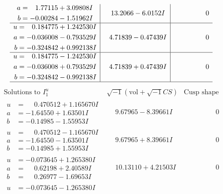 \documentclass[1p]{elsarticle_modified}
\theoremstyle{definition}
\newcommand{\I}{\sqrt{-1}}
\begin{document}
$$\begin{array}{c|c|c}
\begin{aligned}
a &= \phantom{-}1.77115 + 3.09808 I \\
b &= -0.00284 - 1.51962 I\end{aligned}
 & \phantom{-}13.2066 - 6.0152 I & \phantom{-0.000000 } 0 \\ \hline\begin{aligned}
u &= \phantom{-}0.184775 + 1.242530 I \\
a &= -0.036008 - 0.793529 I \\
b &= -0.324842 + 0.992138 I\end{aligned}
 & \phantom{-}4.71839 - 0.47439 I & \phantom{-0.000000 } 0 \\ \hline\begin{aligned}
u &= \phantom{-}0.184775 - 1.242530 I \\
a &= -0.036008 + 0.793529 I \\
b &= -0.324842 - 0.992138 I\end{aligned}
 & \phantom{-}4.71839 + 0.47439 I & \phantom{-0.000000 } 0\\
 \hline 
 \end{array}$$\newpage$$\begin{array}{c|c|c}  
\text{Solutions to }I^u_{1}& \I (\text{vol} + \sqrt{-1}CS) & \text{Cusp shape}\\
 \hline 
\begin{aligned}
u &= \phantom{-}0.470512 + 1.165670 I \\
a &= -1.64550 + 1.63501 I \\
b &= -0.14985 - 1.55953 I\end{aligned}
 & \phantom{-}9.67965 - 8.39661 I & \phantom{-0.000000 } 0 \\ \hline\begin{aligned}
u &= \phantom{-}0.470512 - 1.165670 I \\
a &= -1.64550 - 1.63501 I \\
b &= -0.14985 + 1.55953 I\end{aligned}
 & \phantom{-}9.67965 + 8.39661 I & \phantom{-0.000000 } 0 \\ \hline\begin{aligned}
u &= -0.073645 + 1.265380 I \\
a &= \phantom{-}0.62198 + 2.40589 I \\
b &= \phantom{-}0.26977 - 1.69653 I\end{aligned}
 & \phantom{-}10.13110 + 4.21503 I & \phantom{-0.000000 } 0 \\ \hline\begin{aligned}
u &= -0.073645 - 1.265380 I \\

\end{aligned}
\end{array}$$
\end{document}
